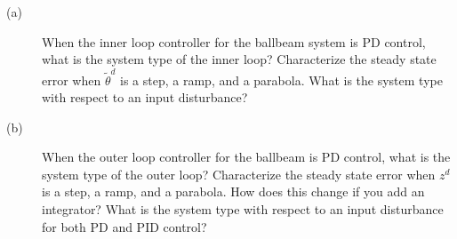 \begin{description}
\item[(a)] When the inner loop controller for the ballbeam system is PD control, what is the system type of the inner loop?  Characterize the steady state error when $\tilde{\theta}^d$ is a step, a ramp, and a parabola.  What is the system type with respect to an input disturbance?
\item[(b)] When the outer loop controller for the ballbeam is PD control, what is the system type of the outer loop?  Characterize the steady state error when $z^d$ is a step, a ramp, and a parabola.  How does this change if you add an integrator?  What is the system type with respect to an input disturbance for both PD and PID control? 
\end{description}

